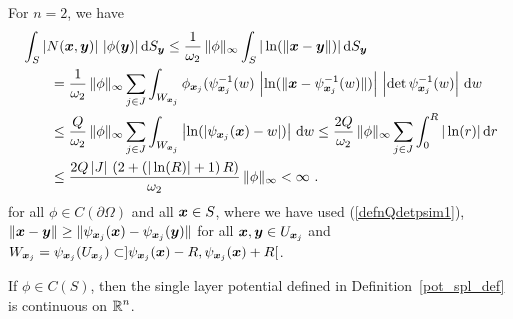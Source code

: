 \begin{enumerate}
For $n=2$, we have
\begin{align*}
&\int_S \left| N({\bm{x}},{\bm{y}}) \right|\, |\phi({\bm{y}})| \,\mathrm{d}{S}_{{\bm{y}}}
\leq \frac{1}{\omega_2} \, \|\phi\|_\infty
\int_S |\ln(\|{\bm{x}}-{\bm{y}}\|)| \,\mathrm{d}{S}_{{\bm{y}}} \\
&\qquad = \frac{1}{\omega_2} \, \|\phi\|_\infty
\sum_{j\in J} \int_{W_{{\bm{x}}_j}}
\phi_{{\bm{x}}_j}(\psi_{{\bm{x}}_j}^{-1}(w)\,
\left|\ln(\|{\bm{x}}-\psi_{{\bm{x}}_j}^{-1}(w)\|)\right|
\,\left|\det\psi_{{\bm{x}}_j}^{-1}(w)\right|  \,\mathrm{d}{w} \\
& \qquad \leq \frac{Q}{\omega_2} \, \|\phi\|_\infty
\sum_{j\in J} \int_{W_{{\bm{x}}_j}}
\left|\ln(|\psi_{{\bm{x}}_j}({\bm{x}})-w|)\right| \,\mathrm{d}{w}
\leq \frac{2Q}{\omega_2} \, \|\phi\|_\infty
\sum_{j\in J} \int_0^R |\ln(r)| \,\mathrm{d}{r} \\
&\qquad
\leq \frac{2Q\,|J|\,
\left( 2 + \left( |\ln(R)| + 1 \right) R\right)}{\omega_2} \, \|\phi\|_\infty
< \infty \ . 
\end{align*}
for all $\phi\in C(\partial \Omega)$ and all ${\bm{x}} \in S$, where
we have used (\ref{defnQdetpsim1}), $\displaystyle \|{\bm{x}}-{\bm{y}}\| 
\geq \|\psi_{{\bm{x}}_j}({\bm{x}}) - \psi_{{\bm{x}}_j}({\bm{y}})\|$ for all
$\displaystyle {\bm{x}},{\bm{y}} \in U_{{\bm{x}}_j}$ and
$\displaystyle W_{{\bm{x}}_j} = \psi_{{\bm{x}}_j}(U_{{\bm{x}}_j}) \subset
]\psi_{{\bm{x}}_j}({\bm{x}}) -R ,  \psi_{{\bm{x}}_j}({\bm{x}}) + R[$.
\end{enumerate}

\begin{prop} \label{pot_slp_cont}
If $\phi \in C(S)$, then the single layer potential
defined in Definition~\ref{pot_spl_def} is continuous on
$\displaystyle \mathbb{R}^n$.
\end{prop}

